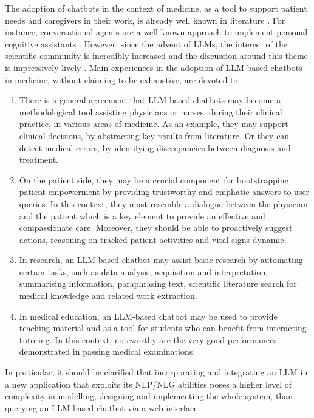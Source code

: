 \documentclass[preprint,12pt]{elsarticle}
\begin{document}
The adoption of chatbots in the context of medicine, as a tool to support patient needs and caregivers in their work, is already well known in literature \cite{3419368}. 
%
For instance, conversational agents are a well known approach to implement personal cognitive assistants \cite{Sulis2023}.
%
However, since the advent of LLMs, the interest of the scientific community is incredibly increased and the discussion around this theme is impressively lively \cite{Thirunavukarasu2023,Clusmann2023,Tian2023,cascella2024}.
% 
Main experiences in the adoption of LLM-based chatbots in medicine, without claiming to be exhaustive, are devoted to:
%
\begin{enumerate}
    \item There is a general agreement that LLM-based chatbots may become a methodological tool assisting physicians or nurses, during their clinical practice, in various areas of medicine. 
    As an example, they may support clinical decisions, by abstracting key results from literature. Or they can detect medical errors, by identifying discrepancies between diagnosis and treatment.

    \item On the patient side, they may be a crucial component for bootstrapping patient empowerment by providing trustworthy and emphatic answers to user queries. In this context, they must resemble a dialogue between the physician and the patient which is a key element to provide an effective and compassionate care. Moreover, they should be able to proactively suggest actions, reasoning on tracked patient activities and vital signs dynamic.

    \item In research, an LLM-based chatbot may assist basic research by automating certain tasks, such as data analysis, acquisition and interpretation, summarising information, paraphrasing text, scientific literature search for medical knowledge and related work extraction.

    \item In medical education, an LLM-based chatbot may be used to provide teaching material and as a tool for students who can benefit from interacting tutoring. In this context, noteworthy are the very good performances demonstrated in passing medical examinations. 

\end{enumerate}
%
\noindent In particular, it should be clarified that incorporating and integrating an LLM in a new application that exploits its NLP/NLG abilities poses a higher level of complexity in modelling, designing and implementing the whole system, than querying an LLM-based chatbot via a web interface.
\end{document}
